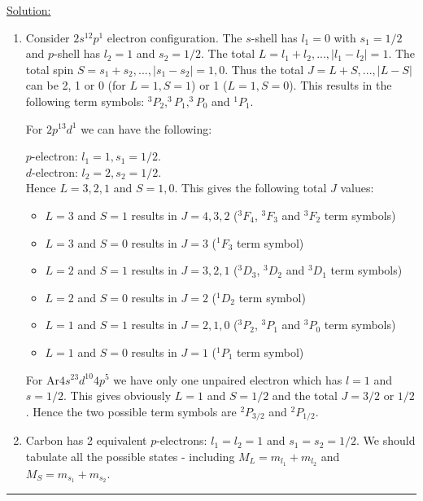 \noindent
\underline{Solution:}\\

\begin{enumerate}
\item Consider $2s^12p^1$ electron configuration. The $s$-shell has $l_1 = 0$ with $s_1 = 1/2$ and $p$-shell has $l_2 = 1$ and $s_2 = 1/2$.
The total $L = l_1 + l_2, ..., \left|l_1 - l_2\right| = 1$. The total spin $S = s_1 + s_2, ..., \left|s_1 - s_2\right| = 1, 0$. Thus the total $J = L + S, ..., \left|L - S\right|$ can be 2, 1 or 0 (for $L = 1, S = 1$) or 1 ($L = 1, S = 0$). This results in the following term symbols: $^3P_2, ^3P_1, ^3P_0$ and $^1P_1$.

For $2p^13d^1$ we can have the following:

$p$-electron: $l_1 = 1, s_1 = 1/2$.\\
$d$-electron: $l_2 = 2, s_2 = 1/2$.\\

Hence $L = 3,2,1$ and $S = 1,0$. This gives the following total $J$ values:

\begin{itemize}
\item $L = 3$ and $S = 1$ results in $J = 4,3,2$ ($^3F_4$, $^3F_3$ and $^3F_2$ term symbols)
\item $L = 3$ and $S = 0$ results in $J = 3$ ($^1F_3$ term symbol)
\item $L = 2$ and $S = 1$ results in $J = 3,2,1$ ($^3D_3$, $^3D_2$ and $^3D_1$ term symbols)
\item $L = 2$ and $S = 0$ results in $J = 2$ ($^1D_2$ term symbol)
\item $L = 1$ and $S = 1$ results in $J = 2,1,0$ ($^3P_2$, $^3P_1$ and $^3P_0$ term symbols)
\item $L = 1$ and $S = 0$ results in $J = 1$ ($^1P_1$ term symbol)
\end{itemize}

For Ar$4s^23d^{10}4p^5$ we have only one unpaired electron which has $l = 1$ and $s = 1/2$. This gives obviously $L = 1$ and $S = 1/2$ and the
total $J = 3/2$ or $1/2$. Hence the two possible term symbols are $^2P_{3/2}$ and $^2P_{1/2}$.

\item Carbon has 2 equivalent $p$-electrons: $l_1 = l_2 = 1$ and $s_1 = s_2 = 1/2$. We should tabulate all the possible states - including $M_L = m_{l_1} + m_{l_2}$ and $M_S = m_{s_1} + m_{s_2}$.

\end{enumerate}

\hrule\vspace{0.5cm}
